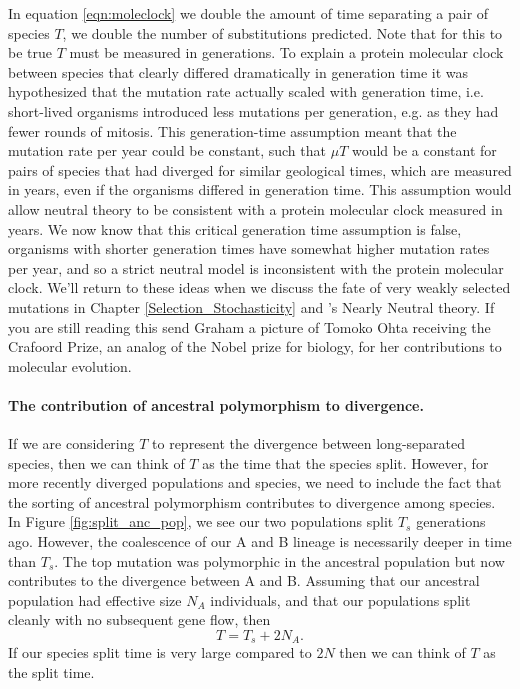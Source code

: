 In equation \eqref{eqn:moleclock} we double the amount of time separating a pair of species $T$, we double the number of substitutions predicted. Note that for this to be true $T$ must be measured in generations. To explain a protein molecular clock between species that clearly differed dramatically in generation time it was hypothesized that the mutation rate actually scaled with generation time, i.e. short-lived organisms introduced less mutations per generation, e.g. as they had fewer rounds of mitosis. This generation-time assumption meant that the mutation rate per year could be constant, such that $\mu T$ would be a constant for pairs of species that had diverged for similar geological times, which are measured in years, even if the organisms differed in generation time. This assumption would allow neutral theory to be consistent with a protein molecular clock measured in years. We now know that this critical generation time assumption is false, organisms with shorter generation times have somewhat higher mutation rates per year, and so a strict neutral model is inconsistent with the protein molecular clock. We'll return to these ideas when we discuss the fate of very weakly selected mutations in Chapter \ref{Selection_Stochasticity} and \citet{ohta1973slightly}'s Nearly Neutral theory. If you are still reading this send Graham a picture of Tomoko Ohta receiving the Crafoord Prize, an analog of the Nobel prize for biology, for her contributions to molecular evolution. 


\paragraph{The contribution of ancestral polymorphism to divergence.} If we are considering $T$ to represent the divergence between long-separated species, then we can think of $T$ as the time that the
species split. However, for more recently diverged populations and
species, we need to include the fact that the sorting of ancestral
polymorphism contributes to divergence among species. In Figure 
\ref{fig:split_anc_pop}, we see our two populations split $T_s$ generations ago.  However, the
coalescence of our A and B lineage is necessarily deeper in time than
$T_s$. The top mutation was polymorphic in the ancestral population
but now contributes to the divergence between A and B. Assuming that
our ancestral population had effective size $N_A$ individuals, and
that our populations split cleanly with no subsequent gene flow, then
\begin{equation}
T = T_s + 2N_A.
\end{equation}
If our species split time is very large compared to $2N$ then we can think of $T$ as the split time. 

